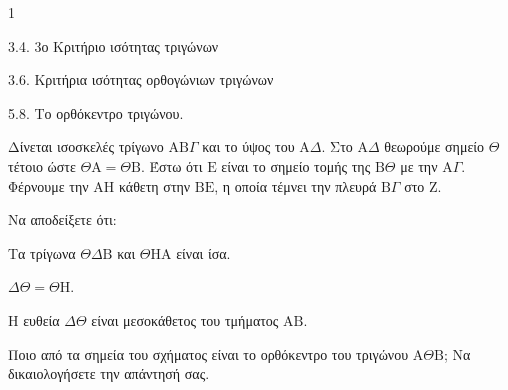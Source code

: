 \begin{ylh}{1}
    \item 3.4. 3ο Κριτήριο ισότητας τριγώνων
    \item 3.6. Κριτήρια ισότητας ορθογώνιων τριγώνων
    \item 5.8. Το ορθόκεντρο τριγώνου.
\end{ylh}
Δίνεται ισοσκελές τρίγωνο $\mathrm{A}\mathrm{B}\Gamma$ και το ύψος του $\mathrm{A}\Delta$. Στο $\mathrm{A}\Delta$ θεωρούμε σημείο $\Theta$ τέτοιο ώστε $\Theta\mathrm{A} = \Theta\mathrm{B}$. Έστω ότι $\mathrm{E}$ είναι το σημείο τομής της $\mathrm{B}\Theta$ με την $\mathrm{A}\Gamma$. Φέρνουμε την $\mathrm{A}\mathrm{H}$ κάθετη στην $\mathrm{B}\mathrm{E}$, η οποία τέμνει την πλευρά $\mathrm{B}\Gamma$ στο $\mathrm{Z}$.
\begin{alist}
    \item Να αποδείξετε ότι:
    \begin{rlist}
        \item Τα τρίγωνα $\Theta\Delta\mathrm{B}$ και $\Theta\mathrm{H}\mathrm{A}$ είναι ίσα. 
        \item $\Delta\Theta = \Theta\mathrm{H}$. 
        \item Η ευθεία $\Delta\Theta$ είναι μεσοκάθετος του τμήματος $\mathrm{A}\mathrm{B}$. 
    \end{rlist}
    \item Ποιο από τα σημεία του σχήματος είναι το ορθόκεντρο του τριγώνου $\mathrm{A}\Theta\mathrm{B}$; Να δικαιολογήσετε την απάντησή σας. 
\end{alist}
